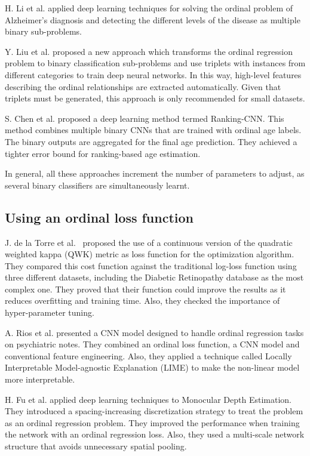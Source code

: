 \documentclass[journal]{IEEEtran}
\begin{document}
	H. Li et al. \cite{li2017deep} applied deep learning techniques for solving the ordinal problem of Alzheimer's diagnosis and detecting the different levels of the disease as multiple binary sub-problems.
	
	Y. Liu et al. \cite{liu2017deep} proposed a new approach which transforms the ordinal regression problem to binary classification sub-problems and use triplets with instances from different categories to train deep neural networks. In this way, high-level features describing the ordinal relationships are extracted automatically. Given that triplets must be generated, this approach is only recommended for small datasets.
	
	S. Chen et al. \cite{chen2017using} proposed a deep learning method termed Ranking-CNN. This method combines multiple binary CNNs that are trained with ordinal age labels. The binary outputs are aggregated for the final age prediction. They achieved a tighter error bound for ranking-based age estimation.
	
	In general, all these approaches increment the number of parameters to adjust, as several binary classifiers are simultaneously learnt.
	
	
	\subsection{Using an ordinal loss function}
	
	J. de la Torre et al.~\cite{de2018weighted} proposed the use of a continuous version of the quadratic weighted kappa (QWK) metric as loss function for the optimization algorithm. They compared this cost function against the traditional log-loss function using three different datasets, including the Diabetic Retinopathy database as the most complex one. They proved that their function could improve the results as it reduces overfitting and training time. Also, they checked the importance of hyper-parameter tuning.
	
	A. Rios et al. \cite{rios2017ordinal} presented a CNN model designed to handle ordinal regression tasks on psychiatric notes. They combined an ordinal loss function, a CNN model and conventional feature engineering. Also, they applied a technique called Locally Interpretable Model-agnostic Explanation (LIME) to make the non-linear model more interpretable.
	
	H. Fu et al. \cite{fu2018deep} applied deep learning techniques to Monocular Depth Estimation. They introduced a spacing-increasing discretization strategy to treat the problem as an ordinal regression problem. They improved the performance when training the network with an ordinal regression loss. Also, they used a multi-scale network structure that avoids unnecessary spatial pooling.
	
\end{document}
